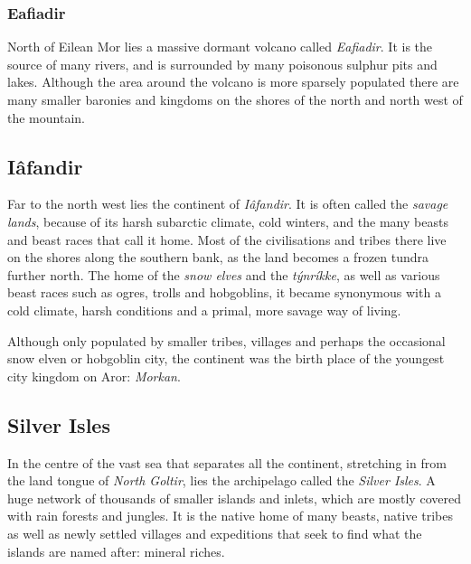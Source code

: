 \subsubsection{Eafiadir}
\label{sec:Eafiadir}

North of Eilean Mor lies a massive dormant volcano called \emph{Eafiadir}. It
is the source of many rivers, and is surrounded by many poisonous sulphur pits
and lakes. Although the area around the volcano is more sparsely populated
there are many smaller baronies and kingdoms on the shores of the north and
north west of the mountain.

\subsection{Iâfandir}
\label{sec:Iafandir}

Far to the north west lies the continent of \emph{Iâfandir}. It is often called
the \emph{savage lands}, because of its harsh subarctic climate, cold winters,
and the many beasts and beast races that call it home. Most of the civilisations
and tribes there live on the shores along the southern bank, as the land becomes
a frozen tundra further north. The home of the \emph{snow elves} and the
\emph{týnríkke}, as well as various beast races such as ogres, trolls and
hobgoblins, it became synonymous with a cold climate, harsh conditions and a
primal, more savage way of living.

Although only populated by smaller tribes, villages and perhaps the occasional
snow elven or hobgoblin city, the continent was the birth place of the youngest
city kingdom on Aror: \emph{Morkan}.

\subsection{Silver Isles}

In the centre of the vast sea that separates all the continent, stretching in
from the land tongue of \emph{North Goltir}, lies the archipelago called the
\emph{Silver Isles}. A huge network of thousands of smaller islands and inlets,
which are mostly covered with rain forests and jungles. It is the native home
of many beasts, native tribes as well as newly settled villages and expeditions
that seek to find what the islands are named after: mineral riches.

